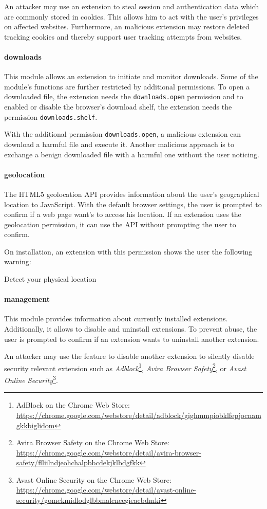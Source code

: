 	An attacker may use an extension to steal session and authentication data which are commonly stored in cookies. This allows him to act with the user's privileges on affected websites. Furthermore, an malicious extension may restore deleted tracking cookies and thereby support user tracking attempts from websites.
	
\paragraph{downloads} 
	This module allows an extension to initiate and monitor downloads. Some of the module's functions are further restricted by additional permissions. To open a downloaded file, the extension needs the \texttt{downloads.open} permission and to enabled or disable the browser's download shelf, the extension needs the permission \texttt{downloads.shelf}.  
	
	With the additional permission \texttt{downloads.open}, a malicious extension can download a harmful file and execute it. Another malicious approach is to exchange a benign downloaded file with a harmful one without the user noticing. 
	
\paragraph{geolocation}
	The HTML5 geolocation API provides information about the user's geographical location to JavaScript. With the default browser settings, the user is prompted to confirm if a web page want's to access his location. If an extension uses the geolocation permission, it can use the API without prompting the user to confirm.
	
	On installation, an extension with this permission shows the user the following warning:
	\begin{permissionwarning}
		Detect your physical location 
	\end{permissionwarning}
	
	\paragraph{management}
	This module provides information about currently installed extensions. Additionally, it allows to disable and uninstall extensions. To prevent abuse, the user is prompted to confirm if an extension wants to uninstall another extension. 
	
	An attacker may use the feature to disable another extension to silently disable security relevant extension such as 
	\textit{Adblock}\footnote{AdBlock on the Chrome Web Store: \url{https://chrome.google.com/webstore/detail/adblock/gighmmpiobklfepjocnamgkkbiglidom}}, 
	\textit{Avira Browser Safety}\footnote{Avira Browser Safety on the Chrome Web Store: \url{https://chrome.google.com/webstore/detail/avira-browser-safety/flliilndjeohchalpbbcdekjklbdgfkk}}, or 
	\textit{Avast Online Security}\footnote{Avast Online Security on the Chrome Web Store: \url{https://chrome.google.com/webstore/detail/avast-online-security/gomekmidlodglbbmalcneegieacbdmki}}.
	
